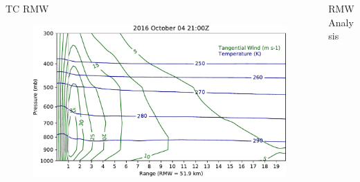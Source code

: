 \documentclass[final]{beamer}
\newlength{\onecolwid}
\newlength{\twocolwid}
\begin{document}
\begin{frame}[containsverbatim]
\begin{columns}[t]
\begin{column}{\twocolwid}
\begin{columns}[t,totalwidth=\twocolwid]
\begin{column}{\onecolwid}
\begin{block}{TC RMW}
\begin{figure}
\end{figure}
\begin{figure}
\includegraphics[width=1.0\linewidth]{../plots/cross_section_2016100421.pdf}
\end{figure}

\end{block}


\end{column} %

\begin{column}{\onecolwid} %


\begin{block}{RMW Analysis}


\end{block}
\end{column}
\end{columns}
\end{column}
\end{columns}
\end{frame}
\end{document}
